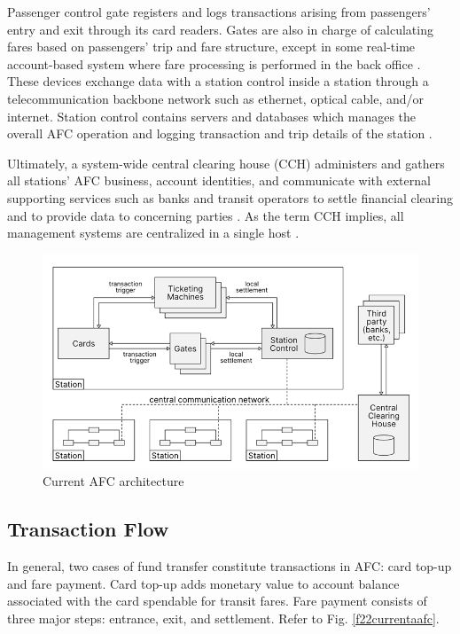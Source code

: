 \documentclass[a4paper,12pt,oneside, utf8x]{report}
\begin{document}
Passenger control gate registers and logs transactions arising from passengers’ entry and exit through its card readers. Gates are also in charge of calculating fares based on passengers’ trip and fare structure, except in some real-time account-based system where fare processing is performed in the back office \cite{a15}. These devices exchange data with a station control inside a station through a telecommunication backbone network such as ethernet, optical cable, and/or internet. Station control contains servers and databases which manages the overall AFC operation and logging transaction and trip details of the station \cite{a4,a16}. 

Ultimately, a system-wide central clearing house (CCH) administers and gathers all stations’ AFC business, account identities, and communicate with external supporting services such as banks and transit operators \cite{a4,a11} to settle financial clearing and to provide data to concerning parties \cite{a13,a15,a18}. As the term CCH implies, all management systems are centralized in a single host \cite{a4,a15}.

    \begin{figure}[H]
        \centering
        \includegraphics[width=.96\textwidth]{figures/2-1.png}
        \caption{Current AFC architecture}
        \label{f21currentaafc}
    \end{figure}
    
\subsection{Transaction Flow}
In general, two cases of fund transfer constitute transactions in AFC: card top-up and fare payment. Card top-up adds monetary value to account balance associated with the card spendable for transit fares. Fare payment consists of three major steps: entrance, exit, and settlement. Refer to Fig. \ref{f22currentaafc}. 
\end{document}
